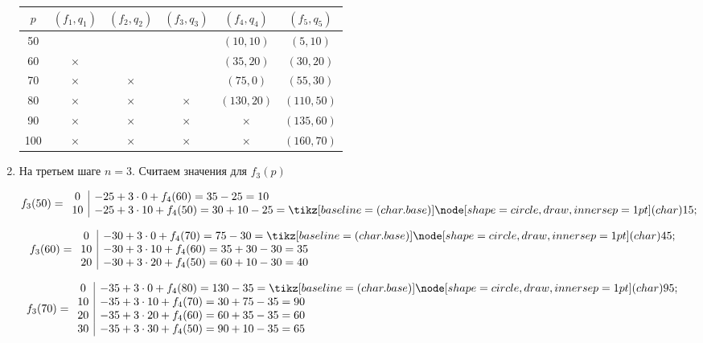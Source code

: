 \begin{enumerate}
	\begin{table}[H]
		\centering
		\begin{tabular}{ | c | c | c | c | c | c | } 
			\hline
			$p$ & $(f_1, q_1)$ & $(f_2, q_2)$ & $(f_3, q_3)$ & $(f_4, q_4)$ & $(f_5, q_5)$ \\ 
			\hline
			50 & & & & $(10, 10)$ & $(5, 10)$ \\\hline
			60 & $\times$ & & & $(35, 20)$ & $(30, 20)$ \\\hline
			70 & $\times$ & $\times$ & & $(75, 0)$ & $(55, 30)$ \\\hline
			80 & $\times$ & $\times$ & $\times$ & $(130, 20)$ & $(110, 50)$ \\\hline
			90 & $\times$ & $\times$ & $\times$ & $\times$ & $(135, 60)$ \\\hline
			100 & $\times$ & $\times$ & $\times$ & $\times$ & $(160, 70)$ \\\hline
		\end{tabular}
	\end{table}
	
	\item[\fbox{\textbf{Шаг 3}}] На третьем шаге $n = 3$. Считаем значения для $f_3(p)$
	
	\[
	f_3(50) = \begin{array}{c|l}
		0 & -25 + 3 \cdot 0 + f_4(60) = 35 - 25 = 10 \\
		10 & -25 + 3 \cdot 10 + f_4(50) = 30 + 10 - 25 = \circled{15} \\
	\end{array}
	\]
	
	\[
	f_3(60) = \begin{array}{c|l}
		0 & -30 + 3 \cdot 0 + f_4(70) = 75 - 30 = \circled{45} \\
		10 & -30 + 3 \cdot 10 + f_4(60) = 35 + 30 - 30 = 35 \\
		20 & -30 + 3 \cdot 20 + f_4(50) = 60 + 10 - 30 = 40 \\
	\end{array}
	\]
	
	\[
	f_3(70) = \begin{array}{c|l}
		0 & -35 + 3 \cdot 0 + f_4(80) = 130 - 35 = \circled{95} \\
		10 & -35 + 3 \cdot 10 + f_4(70) = 30 + 75 - 35 = 90 \\
		20 & -35 + 3 \cdot 20 + f_4(60) = 60 + 35 - 35 = 60 \\
		30 & -35 + 3 \cdot 30 + f_4(50) = 90 + 10 - 35 = 65 \\
	\end{array}
	\]
	

\end{enumerate}
